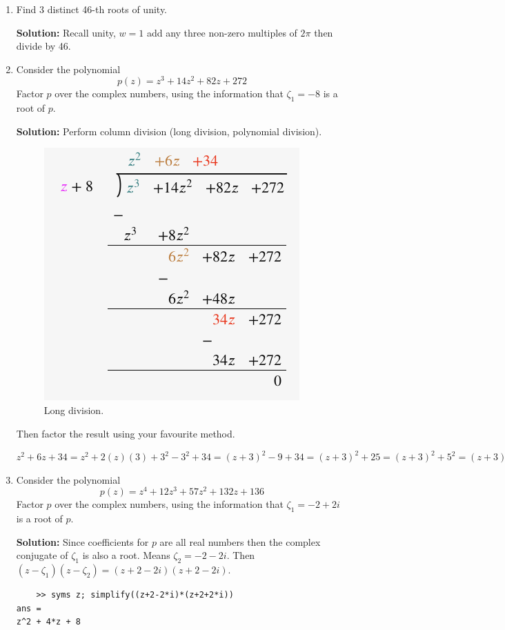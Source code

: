 \documentclass{article}
\begin{document}
\begin{enumerate}
\textbf{Solution:} Add any $2\pi k; k\neq 0$ to your $w=1$ and then divide by $22$.

\item Find 3 distinct 46-th roots of unity. 

\textbf{Solution:} Recall unity, $w=1$ add any three non-zero multiples of $2\pi$ then divide by 46. 

\item Consider the polynomial
$$
p(z)=z^3+14 z^2+82 z+272
$$
Factor $p$ over the complex numbers, using the information that $\zeta_1=-8$ is a root of $p$. 

\textbf{Solution:} Perform column division (long division, polynomial division).  
\begin{figure}[H]
\centering
  \includegraphics[scale=0.35]{lab3polynomial.png}
  \caption{Long division.}
\end{figure}

Then factor the result using your favourite method. 

$z^2+6z+34=z^2+2(z)(3) + 3^2 - 3^2 + 34=(z+3)^2-9+34=(z+3)^2+25=(z+3)^2+5^2=(z+3)^2-(5i)^2=(z+3-5i)(z+3+5i)$

\item Consider the polynomial
$$
p(z)=z^4+12 z^3+57 z^2+132 z+136
$$
Factor $p$ over the complex numbers, using the information that $\zeta_1=-2+2 i$ is a root of $p$.

\textbf{Solution:} Since coefficients for $p$ are all real numbers then the complex conjugate of $\zeta_1$ is also a root. Means $\zeta_2=-2-2i$. Then $(z-\zeta_1)(z-\zeta_2)=(z+2-2i)(z+2-2i)$. 

\begin{verbatim}
	>> syms z; simplify((z+2-2*i)*(z+2+2*i))
ans =
z^2 + 4*z + 8
\end{verbatim}


\end{enumerate}
\end{document}

